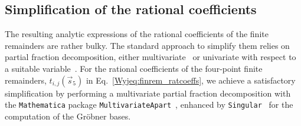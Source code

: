 \documentclass[main.tex]{subfiles}
\begin{document}
\subsection{Simplification of the rational coefficients}
\label{wyjsec:Simplification}
The resulting analytic expressions of the rational coefficients of the finite remainders are rather bulky. The standard approach to simplify them relies on partial fraction decomposition, either multivariate~\cite{Leinartas:1978,Pak:2011xt,Raichev:2012,Abreu:2019odu,Boehm:2020ijp,Heller:2021qkz,Bendle:2021ueg} or univariate with respect to a suitable variable~\cite{Badger:2021nhg,Badger:2021imn,Badger:2021ega,Abreu:2021asb}. For the rational coefficients of the four-point finite remainders, $t_{i,j}\left(\vec{s}_5\right)$ in Eq.~\ref{Wyjeq:finrem_ratcoeffs}, we achieve a satisfactory simplification by performing a multivariate partial fraction decomposition with the \texttt{Mathematica} package \texttt{MultivariateApart}~\cite{Heller:2021qkz}, enhanced by \texttt{Singular}~\cite{DGPS} for the computation of the Gr\"obner bases. 
\end{document}
